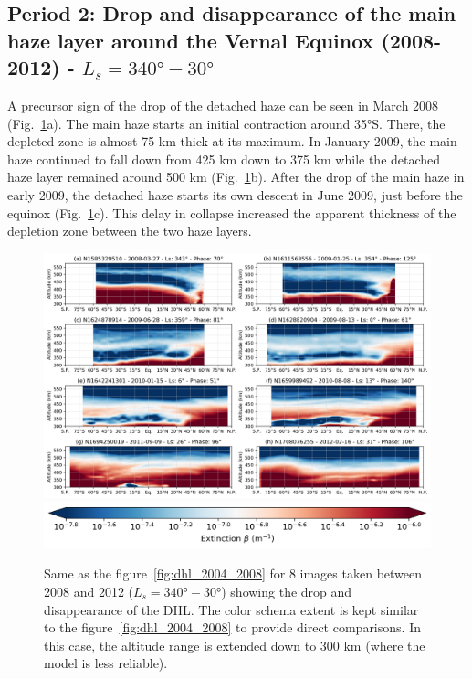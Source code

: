 \subsection{Period 2: Drop and disappearance of the main haze layer around the Vernal Equinox (2008-2012) - $L_s=\ang{340}-\ang{30}$}

A precursor sign of the drop of the detached haze can be seen in March 2008 (Fig.~\ref{fig:dhl_2008_2012}a).
The main haze starts an initial contraction around \ang{35}S. There, the depleted zone is almost
75 km thick at its maximum. In January 2009, the main haze continued to fall down from 425 km down to 375 km
while the detached haze layer remained around 500 km (Fig.~\ref{fig:dhl_2008_2012}b). After the drop
of the main haze in early 2009, the detached haze starts its own descent in June 2009, just before the equinox
(Fig.~\ref{fig:dhl_2008_2012}c). This delay in collapse increased the apparent thickness of the depletion
zone between the two haze layers.

\begin{figure}[!ht]
    \centering
    \includegraphics[width=\textwidth]{Fig/Lat_beta-2008_2012.png}
    \includegraphics[width=.5\textwidth]{Fig/Extinction_colorbar.png}\vspace{-.3cm}
    \caption{Same as the figure~\ref{fig:dhl_2004_2008} for 8 images taken between 2008 and 2012
    ($L_s=\ang{340}-\ang{30}$) showing the drop and disappearance of the DHL.
    The color schema extent is kept similar to the figure~\ref{fig:dhl_2004_2008} to provide
    direct comparisons. In this case, the altitude range is extended down to 300 km
    (where the model is less reliable).}
    \label{fig:dhl_2008_2012}
\end{figure}

